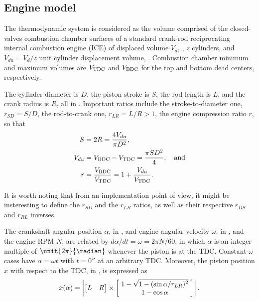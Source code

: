     \subsection{Engine model}\label{sec:model.engine}

    The thermodynamic system is considered as the volume comprised of the closed-valves combustion chamber surfaces of a standard crank-rod reciprocating internal combustion  engine  (ICE)  of
    displaced volume $V_d$, \meter\cubed, $z$ cylinders, and $V_{du} = V_d / z$ unit cylinder displacement volume, \meter\cubed. Combustion chamber minimum and maximum volumes are $V_{\mbox{\scriptsize TDC}}$ and
    $V_{\mbox{\scriptsize BDC}}$ for the top and bottom dead centers, respectively.

    The cylinder diameter is $D$, the piston stroke is $S$, the rod length is $L$, and the crank radius is $R$, all in \meter. Important ratios include the stroke-to-diameter  one,  $r_{SD}  =
    S/D$, the rod-to-crank one, $r_{LR} = L/R > 1$, the engine compression ratio $r$, so that%
    \begin{align}
        \label{eq:S}
        S       &= 2 R = \frac{4 V_{du}}{\pi D^{2}}, \\
        \label{eq:Vdu}
        V_{du}  &= V_{\mbox{\scriptsize BDC}} - V_{\mbox{\scriptsize TDC}} = \frac{\pi SD^2}{4}, \quad\mbox{and} \\
        \label{eq:r}
        r       &= \frac{V_{\mbox{\scriptsize BDC}}}{V_{\mbox{\scriptsize TDC}}} = 1 + \frac{V_{du}}{V_{\mbox{\scriptsize TDC}}}.
    \end{align}

    It is worth noting that from an implementation point of view, it might be insteresting to define the $r_{SD}$ and the $r_{LR}$ ratios, as well as their  respective  $r_{DS}$  and  $r_{RL}$
    inverses.

    The crankshaft angular position $\alpha$, in \radian, and engine angular velocity $\omega$, in \radian\per\second, and the engine RPM $N$, are related by $d\alpha/dt = \omega = 2\pi N/60$,
    in which $\alpha$ is an integer multiple of $\unit{2\pi}{\radian}$ whenever the piston is at the TDC. Constant-$\omega$ cases have $\alpha = \omega t$ with $t =  \unit{0}{\second}$  at  an
    arbitrary TDC. Moreover, the piston position $x$ with respect to the TDC, in \meter, is expressed as%
    \begin{equation}
        \label{eq:x}
        x(\alpha) = \left|
                \left[\begin{matrix}L & R\end{matrix}\right] \times
                \left[\;\begin{matrix}
                    1 - \sqrt{\smash[b]{1 - (\sin\alpha / r_{LR})^2}} \\
                    1 - \cos\alpha
                \end{matrix}\;\right]
            \right|.
    \end{equation}%


